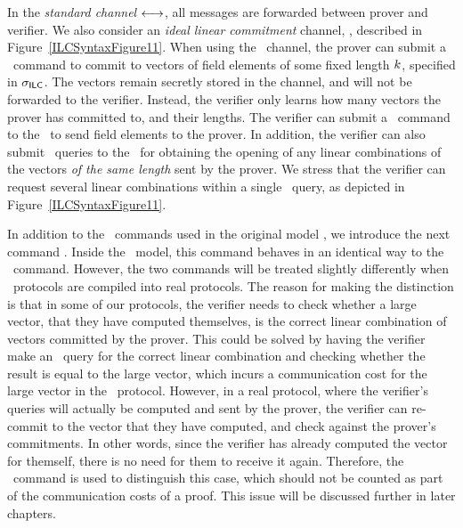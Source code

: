 In the \emph{standard channel} $\longleftrightarrow$, all messages are forwarded between prover and verifier. 
We also consider an \emph{ideal linear commitment}  channel, \ILC, described in Figure~\ref{ILCSyntaxFigure11}. 
When using the \ILC\ channel, the prover can submit a \ILCcommit\ command to commit to 
vectors of field elements of some fixed length $k$, specified in $\mathsf{\sigma}_{\mathsf{ILC}}$. The vectors remain secretly stored in the channel, and will not be forwarded to the verifier. Instead, the verifier only learns how many vectors the prover has committed to, and their lengths. The verifier can submit a \ILCsend\ command to the \ILC\ to send field elements to the prover. In addition, the verifier can also submit \ILCopen\ queries to the \ILC\ for obtaining the opening of any linear combinations of the vectors \emph{of the same length} sent by the prover. We stress that the verifier can request several linear combinations within a single \ILCopen\ query, as depicted in Figure~\ref{ILCSyntaxFigure11}.

In addition to the \ILC\ commands used in the original model \cite{BootleCGGHJ17}, we introduce the next command \ILCcheck. Inside the \ILC \ model, this command behaves in an identical way to the \ILCsend\ command. However, the two commands will be treated slightly differently when \ILC\ protocols are compiled into real protocols. The reason for making the distinction is that in some of our protocols, the verifier needs to check whether a large vector, that they have computed themselves, is the correct linear combination of vectors committed by the prover. This could be solved by having the verifier make an \ILCsend\ query for the correct linear combination and checking whether the result is equal to the large vector, which incurs a communication cost for the large vector in the \ILC\ protocol. However, in a real protocol, where the verifier's queries will actually be computed and sent by the prover, the verifier can re-commit to the vector that they have computed, and check against the prover's commitments. In other words, since the verifier has already computed the vector for themself, there is no need for them to receive it again. Therefore, the \ILCcheck\ command is used to distinguish this case, which should not be counted as part of the communication costs of a proof. This issue will be discussed further in later chapters.

